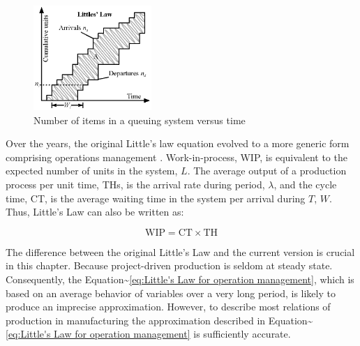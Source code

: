 \documentclass{article}
\begin{document}
\begin{figure}[htbp]
\centering
\includegraphics[height=150]{Figures/Number_of_items_in_a_queuing_system_versus_time.eps}
\caption{\label{fig:orgbf0c827}Number of items in a queuing system versus time}
\end{figure}

 Over the years, the original Little's law equation \citep{Little1961} evolved to a more generic form comprising operations management \citep{Hopp2001}.
Work-in-process, WIP, is equivalent to the expected number of units in the system, \(L\).
The average output of a production process per unit time, THs, is the arrival rate during period, \(\lambda\), and the cycle time, CT, is the average waiting time in the system per arrival during \(T\), \(W\).
Thus, Little's Law can also be written as:

\begin{equation}
  \mbox{WIP} = \mbox{CT} \times \mbox{TH}
   \label{eq:Little's Law for operation management}
\end{equation}

The difference between the original Little's Law and the current version is crucial in this chapter.
Because project-driven production is seldom at steady state.
Consequently, the Equation\textasciitilde{}\ref{eq:Little's Law for operation management}, which is based on an average behavior of variables over a very long period, is likely to produce an imprecise approximation.
However, to describe most relations of production in manufacturing the approximation described in Equation\textasciitilde{}\ref{eq:Little's Law for operation management} is sufficiently accurate.
\end{document}
